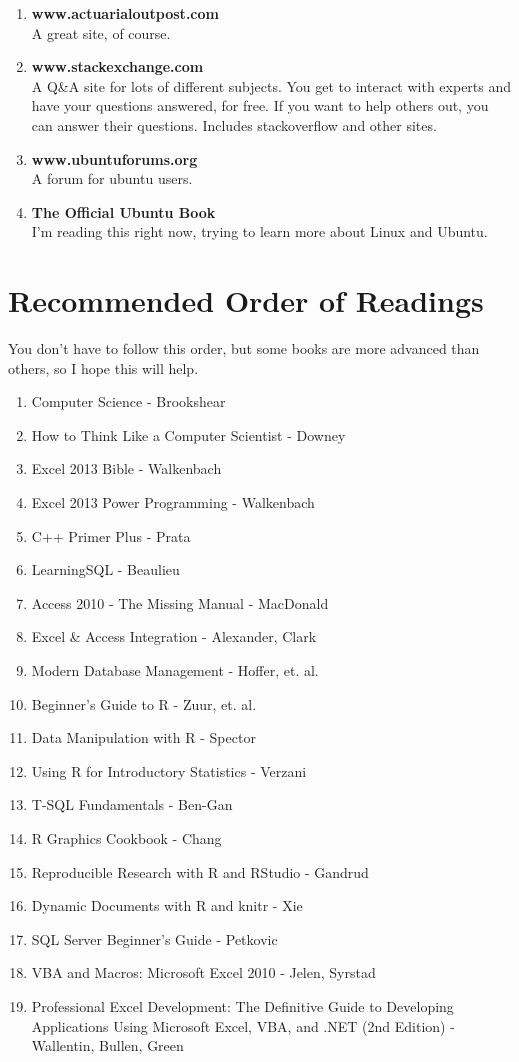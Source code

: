 \documentclass[oneside, titlepage]{article}
\begin{document}
\begin{enumerate}
\item{\bfseries www.actuarialoutpost.com}\\
A great site, of course.
\item{\bfseries www.stackexchange.com}\\
A Q\&A site for lots of different subjects. You get to interact with experts and have your questions answered, for free. If you want to help others out, you can answer their questions. Includes stackoverflow and other sites.
\item{\bfseries www.ubuntuforums.org}\\
A forum for ubuntu users.
\item{\bfseries The Official Ubuntu Book}\\
I'm reading this right now, trying to learn more about Linux and Ubuntu.
\end{enumerate}

\section{Recommended Order of Readings}
You don't have to follow this order, but some books are more advanced than others, so I hope this will help.

\begin{enumerate}
\item{Computer Science - Brookshear}
\item{How to Think Like a Computer Scientist - Downey}
\item{Excel 2013 Bible - Walkenbach}
\item{Excel 2013 Power Programming - Walkenbach}
\item{C++ Primer Plus - Prata}
\item{LearningSQL - Beaulieu}
\item{Access 2010 - The Missing Manual - MacDonald}
\item{Excel \& Access Integration - Alexander, Clark}
\item{Modern Database Management - Hoffer, et. al.}
\item{Beginner's Guide to R - Zuur, et. al.}
\item{Data Manipulation with R - Spector}
\item{Using R for Introductory Statistics - Verzani}
\item{T-SQL Fundamentals - Ben-Gan}
\item{R Graphics Cookbook - Chang}
\item{Reproducible Research with R and RStudio - Gandrud}
\item{Dynamic Documents with R and knitr - Xie}
\item{SQL Server Beginner's Guide - Petkovic}
\item{VBA and Macros: Microsoft Excel 2010 - Jelen, Syrstad}
\item{Professional Excel Development: The Definitive Guide to Developing Applications Using Microsoft Excel, VBA, and .NET (2nd Edition) - Wallentin, Bullen, Green}
\end{enumerate}
\end{document}

